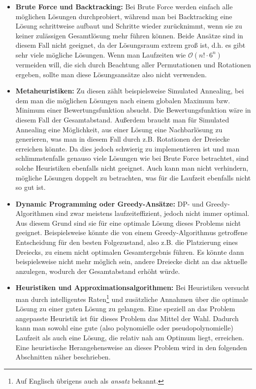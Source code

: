 \documentclass[a4paper, notitlepage, 12pt]{scrartcl}
\begin{document}
 \begin{itemize}
 	\item \textbf{Brute Force und Backtracking:} Bei Brute Force werden einfach alle möglichen Lösungen durchprobiert, während man bei Backtracking eine Lösung schrittweise aufbaut und Schritte wieder zurücknimmt, wenn sie zu keiner zulässigen Gesamtlösung mehr führen können. Beide Ansätze sind in diesem Fall nicht geeignet, da der Lösungsraum extrem groß ist, d.h. es gibt sehr viele mögliche Lösungen. Wenn man Laufzeiten wie $\mathcal{O}(n! \cdot 6^n)$ vermeiden will, die sich durch Beachtung aller Permutationen und Rotationen ergeben, sollte man diese Lösungsansätze also nicht verwenden.
 	\item \textbf{Metaheuristiken:} Zu diesen zählt beispielsweise Simulated Annealing, bei dem man die möglichen Lösungen nach einem globalen Maximum bzw. Minimum einer Bewertungsfunktion absucht. Die Bewertungsfunktion wäre in diesem Fall der Gesamtabstand. Außerdem braucht man für Simulated Annealing eine Möglichkeit, aus einer Lösung eine Nachbarlösung zu generieren, was man in diesem Fall durch z.B. Rotationen der Dreiecke erreichen könnte. Da dies jedoch schwierig zu implementieren ist und man schlimmstenfalls genauso viele Lösungen wie bei Brute Force betrachtet, sind solche Heuristiken ebenfalls nicht geeignet. Auch kann man nicht verhindern, mögliche Lösungen doppelt zu betrachten, was für die Laufzeit ebenfalls nicht so gut ist.
 	\item \textbf{Dynamic Programming oder Greedy-Ansätze:} DP- und Greedy-Algorithmen sind zwar meistens laufzeiteffizient, jedoch nicht immer optimal. Aus diesem Grund sind sie für eine optimale Lösung dieses Problems nicht geeignet. Beispielsweise könnte die von einem Greedy-Algorithmus getroffene Entscheidung für den besten Folgezustand, also z.B. die Platzierung eines Dreiecks, zu einem nicht optimalen Gesamtergebnis führen. Es könnte dann beispielsweise nicht mehr möglich sein, andere Dreiecke dicht an das aktuelle anzulegen, wodurch der Gesamtabstand erhöht würde.
 	\item \textbf{Heuristiken und Approximationsalgorithmen:} Bei Heuristiken versucht man durch intelligentes Raten\footnote{Auf Englisch übrigens auch als \textit{ansatz} bekannt.} und zusätzliche Annahmen über die optimale Lösung zu einer guten Lösung zu gelangen. Eine speziell an das Problem angepasste Heuristik ist für dieses Problem das Mittel der Wahl. Dadurch kann man sowohl eine gute (also polynomielle oder pseudopolynomielle) Laufzeit als auch eine Lösung, die relativ nah am Optimum liegt, erreichen. Eine heuristische Herangehensweise an dieses Problem wird in den folgenden Abschnitten näher beschrieben.
 \end{itemize}
\end{document}
